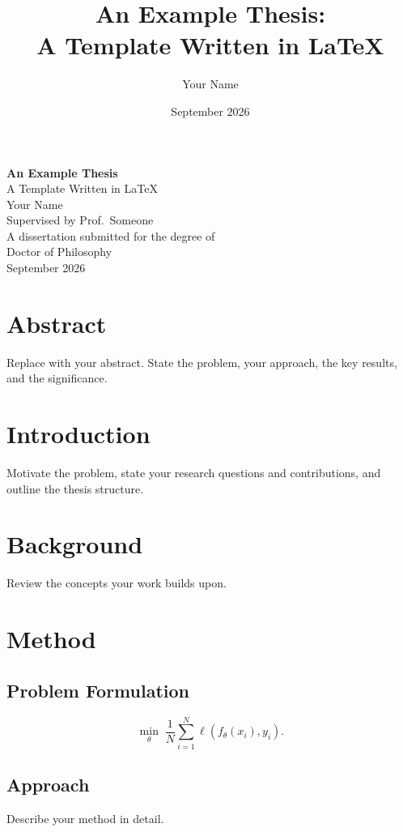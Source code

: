 \documentclass[12pt, oneside]{book}
\title{An Example Thesis: \\ \large A Template Written in \LaTeX}
\author{Your Name}
\date{September 2026}
\begin{document}
\frontmatter
\begin{titlepage}
  \centering
  \vspace*{3cm}
  {\LARGE\bfseries An Example Thesis}\\[1cm]
  {\large A Template Written in \LaTeX}\\[2cm]
  {\large Your Name}\\[0.5em]
  {\large Supervised by Prof.~Someone}\\[2cm]
  {\large A dissertation submitted for the degree of}\\[0.3em]
  {\large Doctor of Philosophy}\\[1cm]
  {\large September 2026}
\end{titlepage}

\chapter*{Abstract}
Replace with your abstract. State the problem, your approach, the key
results, and the significance.

\tableofcontents
\listoffigures
\listoftables

\mainmatter

\chapter{Introduction}
Motivate the problem, state your research questions and contributions,
and outline the thesis structure.

\chapter{Background}
Review the concepts your work builds upon.

\chapter{Method}
\section{Problem Formulation}
\begin{equation}
  \min_{\theta} \; \frac{1}{N}\sum_{i=1}^{N}
  \ell\!\left(f_\theta(x_i), y_i\right).
\end{equation}

\section{Approach}
Describe your method in detail.
\end{document}

